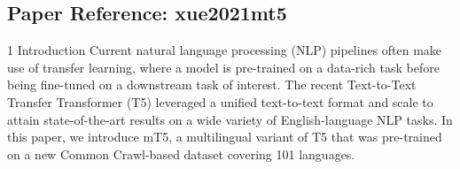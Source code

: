 \documentclass[11pt,a4paper]{article}
\begin{document}
\vspace{18pt}


\subsection*{Paper Reference: xue2021mt5}

1 Introduction Current natural language processing (NLP) pipelines often make use of transfer learning, where a model is pre-trained on a data-rich task before being fine-tuned on a downstream task of interest. The recent Text-to-Text Transfer Transformer (T5) leveraged a unified text-to-text format and scale to attain state-of-the-art results on a wide variety of English-language NLP tasks. In this paper, we introduce mT5, a multilingual variant of T5 that was pre-trained on a new Common Crawl-based dataset covering 101 languages.
\end{document}
